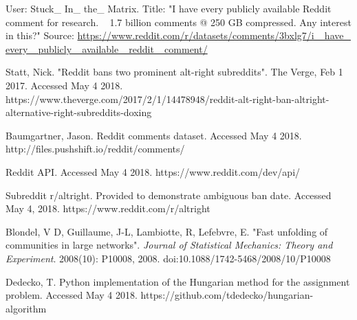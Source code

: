 \documentclass[twoside,twocolumn]{article}
\begin{document}
\begin{thebibliography}{99}
 User: Stuck\_ In\_ the\_ Matrix. Title: "I have every publicly available Reddit comment for research. ~ 1.7 billion comments @ 250 GB compressed. Any interest in this?" Source: \url{https://www.reddit.com/r/datasets/comments/3bxlg7/i\_ have\_ every\_ publicly\_ available\_ reddit\_ comment/}

Statt, Nick. "Reddit bans two prominent alt-right subreddits". The Verge, Feb 1 2017. Accessed May 4 2018. https://www.theverge.com/2017/2/1/14478948/reddit-alt-right-ban-altright-alternative-right-subreddits-doxing

Baumgartner, Jason. Reddit comments dataset. Accessed May 4 2018. http://files.pushshift.io/reddit/comments/

Reddit API. Accessed May 4 2018. https://www.reddit.com/dev/api/

Subreddit r/altright. Provided to demonstrate ambiguous ban date. Accessed May 4, 2018. https://www.reddit.com/r/altright

Blondel, V D, Guillaume, J-L, Lambiotte, R, Lefebvre, E. "Fast unfolding of communities in large networks". \textit{Journal of Statistical Mechanics: Theory and Experiment}. 2008(10): P10008, 2008. doi:10.1088/1742-5468/2008/10/P10008

Dedecko, T. Python implementation of the Hungarian method for the assignment problem. Accessed May 4 2018. https://github.com/tdedecko/hungarian-algorithm

\end{thebibliography}

%
%


\onecolumn
\end{document}
